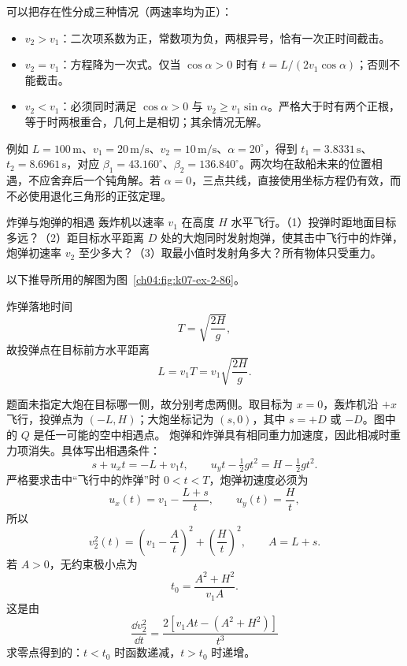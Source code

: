 {\begin{xesolution}
可以把存在性分成三种情况（两速率均为正）：
\begin{itemize}
\item $v_2>v_1$：二次项系数为正，常数项为负，两根异号，恰有一次正时间截击。
\item $v_2=v_1$：方程降为一次式。仅当 $\cos\alpha>0$ 时有 $t=L/(2v_1\cos\alpha)$；否则不能截击。
\item $v_2<v_1$：必须同时满足 $\cos\alpha>0$ 与 $v_2\ge v_1\sin\alpha$。严格大于时有两个正根，等于时两根重合，几何上是相切；其余情况无解。
\end{itemize}
例如 $L=100\,\mathrm m$、$v_1=20\,\mathrm{m/s}$、$v_2=10\,\mathrm{m/s}$、$\alpha=20^\circ$，得到 $t_1=3.8331\,\mathrm s$、$t_2=8.6961\,\mathrm s$，对应 $\beta_1=43.160^\circ$、$\beta_2=136.840^\circ$。两次均在敌船未来的位置相遇，不应舍弃后一个钝角解。若 $\alpha=0$，三点共线，直接使用坐标方程仍有效，而不必使用退化三角形的正弦定理。
\end{xesolution}

\begin{origexamplebox}{炸弹与炮弹的相遇}\label{ch04:ex:k07-2-86}
轰炸机以速率 $v_1$ 在高度 $H$ 水平飞行。（1）投弹时距地面目标多远？（2）距目标水平距离 $D$ 处的大炮同时发射炮弹，使其击中飞行中的炸弹，炮弹初速率 $v_2$ 至少多大？（3）取最小值时发射角多大？所有物体只受重力。

\begin{qualityfigure}
\label{mech:04:86:q}
\end{qualityfigure}
\end{origexamplebox}
\begin{xesolution}
以下推导所用的解图为图~\ref{ch04:fig:k07-ex-2-86}。

炸弹落地时间
\[
T=\sqrt{\frac{2H}{g}},
\]
故投弹点在目标前方水平距离
\[
\boxed{L=v_1T=v_1\sqrt{\frac{2H}{g}}}.
\]

题面未指定大炮在目标哪一侧，故分别考虑两侧。取目标为 $x=0$，轰炸机沿 $+x$ 飞行，投弹点为 $(-L,H)$；大炮坐标记为 $(s,0)$，其中 $s=+D$ 或 $-D$。图中的 $Q$ 是任一可能的空中相遇点。
\BombInterceptDiagram
炮弹和炸弹具有相同重力加速度，因此相减时重力项消失。具体写出相遇条件：
\[
s+u_xt=-L+v_1t,\qquad
u_yt-\tfrac12gt^2=H-\tfrac12gt^2.
\]
严格要求击中“飞行中的炸弹”时 $0<t<T$，炮弹初速度必须为
\[
u_x(t)=v_1-\frac{L+s}{t},\qquad u_y(t)=\frac Ht,
\]
所以
\[
v_2^2(t)=\left(v_1-\frac{A}{t}\right)^2+\left(\frac Ht\right)^2,
\qquad A=L+s.
\]
若 $A>0$，无约束极小点为
\[
t_0=\frac{A^2+H^2}{v_1A}.
\]
这是由
\[
\frac{\dd v_2^2}{\dd t}
=\frac{2[v_1At-(A^2+H^2)]}{t^3}
\]
求零点得到的：$t<t_0$ 时函数递减，$t>t_0$ 时递增。


\end{xesolution}}
